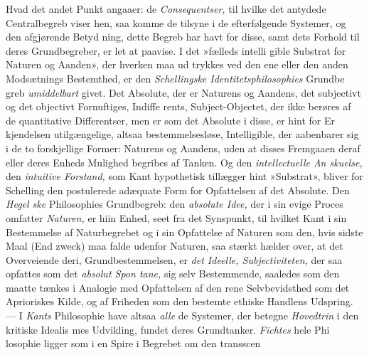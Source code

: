 Hvad det andet Punkt angaaer: de \emph{Consequentser,} til
hvilke det antydede Centralbegreb viser hen, saa komme de
tilsyne i de efterfølgende Systemer, og den afgjørende Betyd\-%
ning, dette Begreb har havt for disse, samt dets Forhold til
deres Grundbegreber, er let at paavise. I det »fælleds intelli\-%
gible Substrat for Naturen og Aanden», der hverken maa ud\-%
trykkes ved den ene eller den anden Modsætnings Bestemthed,
er den \emph{Schellingske Identitetsphilosophies} Grundbe\-%
greb \emph{umiddelbart} givet. Det Absolute, der er Naturens og
Aandens, det subjectivt og det objectivt Fornuftiges, Indiffe\-%
rents, Subject-Objectet, der ikke berøres af de quantitative
Differentser, men er som det Absolute i disse, er hint for Er\-%
kjendelsen utilgængelige, altsaa bestemmelsesløse, Intelligible,
der aabenbarer sig i de to forskjellige Former: Naturens og
Aandens, uden at disses Fremgaaen deraf eller deres Enheds
Mulighed begribes af Tanken. Og den \emph{intellectuelle An\-%
skuelse,} den \emph{intuitive Forstand,} som Kant hypothetisk
tillægger hint »Substrat», bliver for Schelling den postulerede
adæquate Form for Opfattelsen af det Absolute. Den \emph{Hegel\-%
ske} Philosophies Grundbegreb: den \emph{absolute Idee,} der i
sin evige Proces omfatter \emph{Naturen,} er hiin Enhed, seet fra det
Synspunkt, til hvilket Kant i sin Bestemmelse af Naturbegrebet
og i sin Opfattelse af Naturen som den, hvis sidste Maal (End\-%
zweck) maa falde udenfor Naturen, saa stærkt hælder over,
at det Overveiende deri, Grundbestemmelsen, er \emph{det Ideelle,
Subjectiviteten,} der saa opfattes som det \emph{absolut Spon\-%
tane,} sig selv Bestemmende, saaledes som den maatte tænkes
i Analogie med Opfattelsen af den rene Selvbevidsthed som
det Aprioriskes Kilde, og af Friheden som den bestemte ethiske
Handlens Udspring. --- I \emph{Kants} Philosophie have altsaa \emph{alle}
de Systemer, der betegne \emph{Hovedtrin} i den kritiske Idealis\-%
mes Udvikling, fundet deres Grundtanker. \emph{Fichtes} hele Phi\-%
losophie ligger som i en Spire i Begrebet om den transscen\-%
